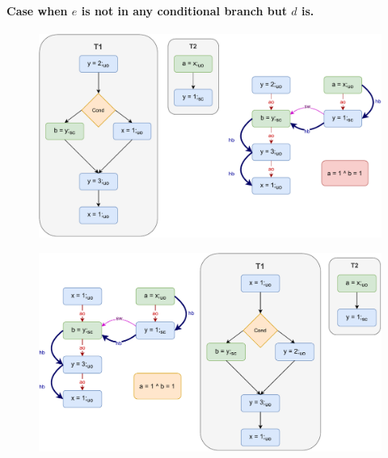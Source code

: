         \paragraph{Case when $e$ is not in any conditional branch but $d$ is.}

            \begin{figure}
                \centering 
                \includegraphics[scale=0.7]{InstructionReordering/CounterExamples1a(Conditionals).pdf}
                \caption{}
            \end{figure}

            \begin{figure}
                \centering 
                \includegraphics[scale=0.7]{InstructionReordering/CounterExamples1b(Conditionals).pdf}
                \caption{}
            \end{figure}


